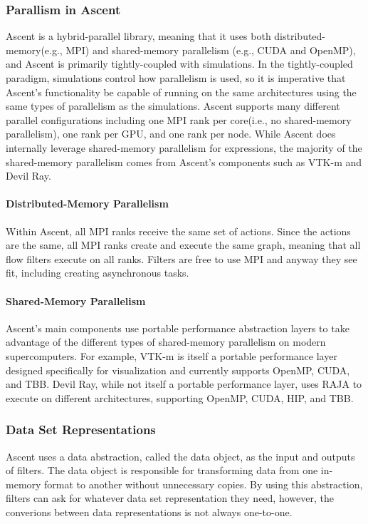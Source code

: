 \subsubsection{Parallism in Ascent}
Ascent is a hybrid-parallel library, meaning that it uses both
distributed-memory(e.g., MPI) and shared-memory parallelism
(e.g., CUDA and OpenMP), and Ascent is primarily
tightly-coupled with simulations.
%
In the tightly-coupled paradigm, simulations control how parallelism is used, so
it is imperative that Ascent's functionality be capable of running
on the same architectures using the same types of parallelism as the
simulations.
%
Ascent supports many different parallel configurations including
one MPI rank per core(i.e., no shared-memory parallelism), one rank
per GPU, and one rank per node.
%
While Ascent does internally leverage shared-memory parallelism
for expressions, the majority of the shared-memory parallelism comes
from Ascent's components such as VTK-m and Devil Ray.

\paragraph{Distributed-Memory Parallelism}
Within Ascent, all MPI ranks receive the same set of actions.
%
Since the actions are the same, all MPI ranks create and execute the same graph,
meaning
that all flow filters execute on all ranks.
%
Filters are free to use MPI and anyway they see fit, including
creating asynchronous tasks.

\paragraph{Shared-Memory Parallelism}
Ascent's main components use portable performance abstraction layers to
take advantage of the different types of shared-memory parallelism on
modern supercomputers.
%
For example, VTK-m is itself a portable performance layer designed specifically
for visualization and currently supports OpenMP, CUDA, and TBB.
%
Devil Ray, while not itself a portable performance layer, uses RAJA to execute
on different architectures, supporting OpenMP, CUDA, HIP, and TBB.

\subsubsection{Data Set Representations}
Ascent uses a data abstraction, called the data object, as the input
and outputs of filters.
%
The data object is responsible for transforming data from one in-memory format
to another without unnecessary copies.
%
By using this abstraction, filters can ask for whatever data set
representation they need, however, the converions between data
representations is not always one-to-one.
%

